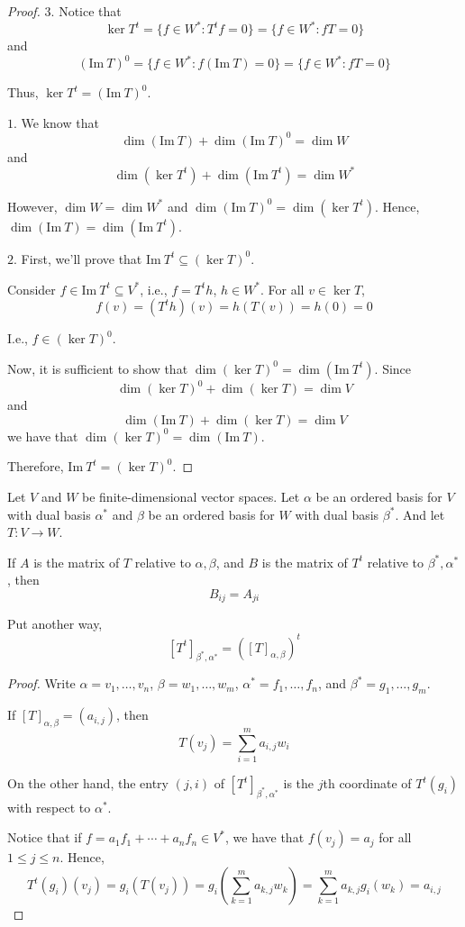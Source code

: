 \begin{proof}
	$3.$ Notice that 
	\[
		\ker T^t = \{ f \in W^\ast : T^t f = 0 \} = \{ f \in W^\ast : fT = 0 \}
	\]
	and
	\[
		(\text{Im}~T)^0 = \{ f \in W^\ast : f(\text{Im}~T) = 0 \} = \{ f \in W^\ast : fT = 0 \}
	\]
	
	Thus, $\ker T^t = (\text{Im}~T)^0$.
	
	$1.$ We know that
	\[
		\dim (\text{Im}~T) + \dim (\text{Im}~T)^0 = \dim W
	\]
	and
	\[
		\dim (\ker T^t) + \dim (\text{Im}~T^t) = \dim W^\ast
	\]
	
	However, $\dim W = \dim W^\ast$ and $\dim (\text{Im}~T)^0 = \dim (\ker T^t)$. Hence, $\dim (\text{Im}~T) = \dim(\text{Im}~T^t)$.
	
	$2.$ First, we'll prove that $\text{Im}~T^t \subseteq (\ker T)^0$.
	
	Consider $f \in \text{Im}~T^t \subseteq V^\ast$, i.e., $f = T^t h$, $h \in W^\ast$. For all $v \in \ker T$,
	\[
		f(v) = (T^t h)(v) = h(T(v)) = h(0) = 0
	\]
	
	I.e., $f \in (\ker T)^0$.
	
	Now, it is sufficient to show that $\dim (\ker T)^0 = \dim (\text{Im}~T^t)$. Since
	\[
		\dim (\ker T)^0 + \dim (\ker T) = \dim V
	\]
	and
	\[
		\dim (\text{Im}~T) + \dim (\ker T) = \dim V
	\]
	we have that $\dim (\ker T)^0 = \dim (\text{Im}~T)$.
	
	Therefore, $\text{Im}~T^t = (\ker T)^0$.
\end{proof}

\begin{theorem}
	Let $V$ and $W$ be finite-dimensional vector spaces. Let $\alpha$ be an ordered basis for $V$ with dual basis $\alpha^\ast$ and $\beta$ be an ordered basis for $W$ with dual basis $\beta^\ast$. And let $T : V \longrightarrow W$.

	If $A$ is the matrix of $T$ relative to $\alpha, \beta$, and $B$ is the matrix of $T^t$ relative to $\beta^\ast, \alpha^\ast$, then 
	\[ 
		B_{ij} = A_{ji}
	\]

	Put another way,
	\[
		[T^t]_{\beta^\ast, \alpha^\ast} = ([T]_{\alpha, \beta})^t
	\]
\end{theorem}

\begin{proof}
  Write $\alpha = v_1, \ldots, v_n$, $\beta = w_1, \ldots, w_m$, $\alpha^\ast = f_1, \ldots, f_n$, and $\beta^\ast = g_1, \ldots, g_m$. 

  If $[T]_{\alpha, \beta} = (a_{i,j})$, then 
  \[
    T(v_j) = \sum_{i=1}^m a_{i,j}w_i
  \]

  On the other hand, the entry $(j,i)$ of $[T^t]_{\beta^\ast, \alpha^\ast}$ is the $j$th coordinate of $T^t(g_i)$ with respect to $\alpha^\ast$. 

  Notice that if $f = a_1 f_1 + \cdots + a_n f_n \in V^\ast$, we have that $f(v_j) = a_j$ for all $1 \leq j \leq n$. Hence, 
  \[
    T^t(g_i)(v_j) = g_i(T(v_j)) = g_i \left( \sum_{k=1}^m a_{k,j} w_k \right) = \sum_{k=1}^m a_{k,j} g_i(w_k) = a_{i,j}
  \]
\end{proof}

